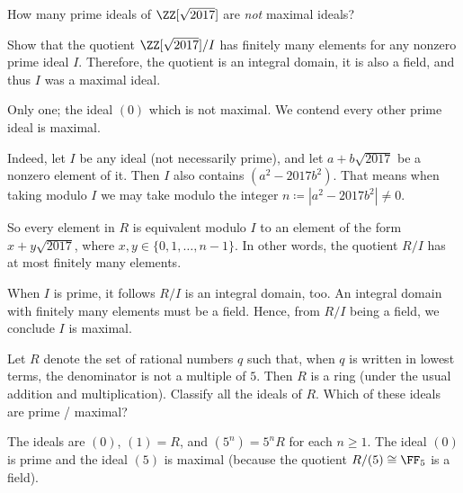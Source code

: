 \begin{dproblem}
	How many prime ideals of $\ZZ[\sqrt{2017}]$ are \emph{not} maximal ideals?
	\label{prob:dedekind_sample}
	\begin{hint}
		Show that the quotient $\ZZ[\sqrt{2017}]/I$ has finitely many elements
		for any nonzero prime ideal $I$.
		Therefore, the quotient is an integral domain, it is also a field,
		and thus $I$ was a maximal ideal.
	\end{hint}
	\begin{sol}
		Only one; the ideal $(0)$ which is not maximal.
		We contend every other prime ideal is maximal.

		Indeed, let $I$ be any ideal (not necessarily prime),
		and let $a + b \sqrt{2017}$ be a nonzero element of it.
		Then $I$ also contains $(a^2-2017b^2)$.
		That means when taking modulo $I$ we may take modulo the integer
		$n \coloneq |a^2-2017b^2| \neq 0$.

		So every element in $R$ is equivalent modulo $I$
		to an element of the form $x + y \sqrt{2017}$,
		where $x,y \in \{0, 1, \dots, n-1\}$.
		In other words, the quotient $R/I$ has at most finitely many elements.

		When $I$ is prime, it follows $R/I$ is an integral domain, too.
		An integral domain with finitely many elements must be a field.
		Hence, from $R/I$ being a field, we conclude $I$ is maximal.
	\end{sol}
\end{dproblem}

\begin{problem}
	Let $R$ denote the set of rational numbers $q$ such that,
	when $q$ is written in lowest terms, the denominator is not a multiple of $5$.
	Then $R$ is a ring (under the usual addition and multiplication).
	Classify all the ideals of $R$.
	Which of these ideals are prime / maximal?
	\begin{sol}
		The ideals are $(0)$, $(1) = R$, and $(5^n) = 5^n R$ for each $n \ge 1$.
		The ideal $(0)$ is prime and the ideal $(5)$ is maximal
		(because the quotient $R/(5) \cong \FF_5$ is a field).
	\end{sol}
\end{problem}
